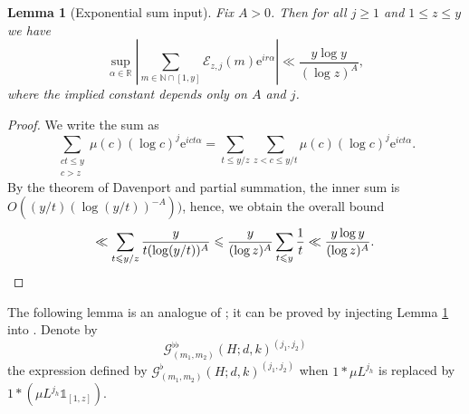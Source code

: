 \documentclass[reqno, 11pt]{amsart}
\numberwithin{equation}{section}
\newtheorem{lemma}[theorem]{Lemma}
\theoremstyle{definition}
\newcommand{\0}{\mathbf{0}}
\renewcommand{\leq}{\leqslant}
\renewcommand{\geq}{\geqslant}
\renewcommand{\leq}{\leqslant}
\renewcommand{\geq}{\geqslant}
\renewcommand{\#}{\sharp}
\begin{document}
\begin{lemma}[Exponential sum input] \label{lem:davenport}  Fix $A > 0$. Then for all $j\geq 1$ and $ 1\leq z \leq  y $ we have 
\[\sup_{\alpha \in \mathbb{R}} \left| \sum_{m \in \mathbb{N} \cap [1, y]} \mathscr{E}_{z,j}(m) \mathrm{e}^{i r\alpha} \right| 
\ll  \frac{ y \log y}{(\log z)^{A}},\] where the implied constant depends only on $A$ and $j$. \end{lemma}\begin{proof} 
We write the sum as  $$ \sum_{\substack{ c t \leq y \\ c>z  }} \mu(c) (\log c)^j  \mathrm{e}^{i ct \alpha} = 
\sum_{  t \leq y/z } \sum_{ z< c \leq y/t   } \mu(c) (\log c)^j  \mathrm{e}^{i ct \alpha}  .$$ 
By the theorem of Davenport \cite{davenport} and partial summation, the inner sum is $O((y/t)(\log (y/t))^{-A} ))$,
hence, we obtain the overall bound  \[  \ll  \sum_{  t \leq y/z } \frac{y}{t (\log (y/t))^{A}} 
\leq   \frac{y }{(\log z)^{A}} \sum_{  t \leq y  } \frac{1}{t}\ll  \frac{y \log y}{(\log z)^{A}}
.\qedhere\] \end{proof} 
The following lemma is an  analogue of \cite[Proposition 3.8]{MR4542704}; it can be proved by injecting  Lemma \ref{lem:davenport} into
\cite[Lemmas 3.4-3.5]{MR4542704}. Denote by  $$ \mathcal G^{\flat\flat}_{(m_1,m_2)}(H;d,k)^{(j_1,j_2)}$$ the expression 
defined by   $ \mathcal G^\flat_{(m_1,m_2)}(H;d,k)^{(j_1,j_2)}$ when  $1\ast  \mu L^{j_h}$ is replaced by 
$1\ast ( \mu L^{j_h}\mathds 1_{[1,z]})$.
\end{document}
